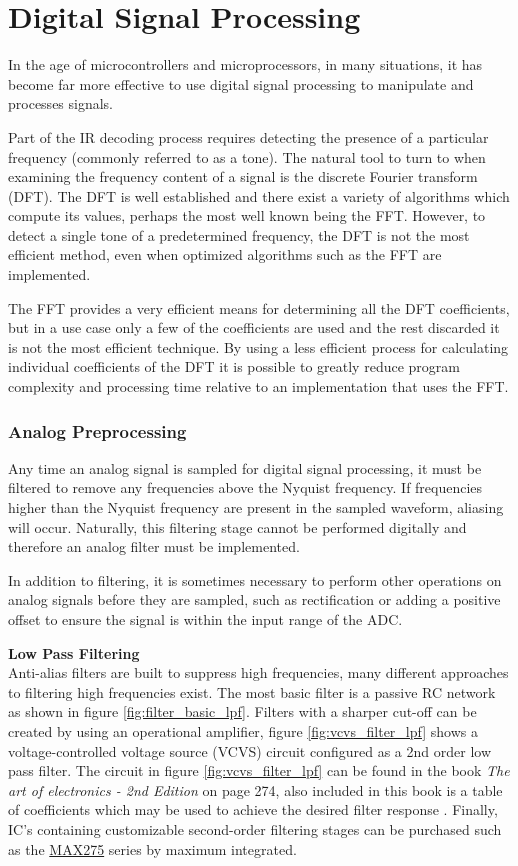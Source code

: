 \section{Digital Signal Processing}
In the age of microcontrollers and microprocessors, in many situations, it has become far more effective to use digital signal processing to manipulate and processes signals.

Part of the IR decoding process requires detecting the presence of a particular frequency (commonly referred to as a tone). The natural tool to turn to when examining the frequency content of a signal is the discrete Fourier transform (DFT). The DFT is well established and there exist a variety of algorithms which compute its values, perhaps the most well known being the FFT. However, to detect a single tone of a predetermined frequency, the DFT is not the most efficient method, even when optimized algorithms such as the FFT are implemented.

The FFT provides a very efficient means for determining all the DFT coefficients, but in a use case only a few of the coefficients are used and the rest discarded it is not the most efficient technique. By using a less efficient process for calculating individual coefficients of the DFT it is possible to greatly reduce program complexity and processing time relative to an implementation that uses the FFT.


\subsubsection{Analog Preprocessing}

Any time an analog signal is sampled for digital signal processing, it must be filtered to remove any frequencies above the Nyquist frequency. If frequencies higher than the Nyquist frequency are present in the sampled waveform, aliasing will occur. Naturally, this filtering stage cannot be performed digitally and therefore an analog filter must be implemented.

In addition to filtering, it is sometimes necessary to perform other operations on analog signals before they are sampled, such as rectification or adding a positive offset to ensure the signal is within the input range of the ADC.

\textbf{Low Pass Filtering}\\
Anti-alias filters are built to suppress high frequencies, many different approaches to filtering high frequencies exist. The most basic filter is a passive RC network as shown in figure \ref{fig:filter_basic_lpf}. Filters with a sharper cut-off can be created by using an operational amplifier, figure \ref{fig:vcvs_filter_lpf} shows a voltage-controlled voltage source (VCVS) circuit configured as a 2nd order low pass filter. The circuit in figure \ref{fig:vcvs_filter_lpf} can be found in the book \textit{The art of electronics - 2nd Edition} on page 274, also included in this book is a table of coefficients which may be used to achieve the desired filter response \cite{Horowitz1995}. Finally, IC's containing customizable second-order filtering stages can be purchased such as the \href{https://www.maximintegrated.com/en/products/analog/analog-filters/MAX275.html/tb_tab0}{MAX275} series by maximum integrated.

